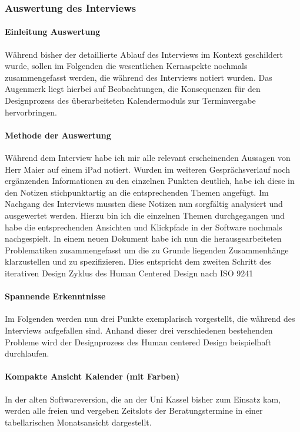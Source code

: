 \documentclass[12pt]{article}
\newcommand{\ipName}{Herr Maier }
\begin{document}
\subsubsection{Auswertung des Interviews}

\paragraph{Einleitung Auswertung}
Während bisher der detaillierte Ablauf des Interviews im Kontext geschildert
wurde, sollen im Folgenden die wesentlichen Kernaspekte nochmals
zusammengefasst werden, die während des Interviews notiert wurden. Das
Augenmerk liegt hierbei auf Beobachtungen, die Konsequenzen für den
Designprozess des überarbeiteten Kalendermoduls zur Terminvergabe
hervorbringen.

\paragraph{Methode der Auswertung}
Während dem Interview habe ich mir alle relevant erscheinenden Aussagen von
\ipName auf einem iPad notiert. Wurden im weiteren Gesprächsverlauf noch
ergänzenden Informationen zu den einzelnen Punkten deutlich, habe ich diese in
den Notizen stichpunktartig an die entsprechenden Themen angefügt. Im Nachgang
des Interviews mussten diese Notizen nun sorgfältig analysiert und ausgewertet
werden. Hierzu bin ich die einzelnen Themen durchgegangen und habe die
entsprechenden Ansichten und Klickpfade in der Software nochmals nachgespielt.
In einem neuen Dokument habe ich nun die herausgearbeiteten Problematiken
zusammengefasst um die zu Grunde liegenden Zusammenhänge klarzustellen und zu
spezifizieren. Dies entspricht dem zweiten Schritt des iterativen Design Zyklus
des Human Centered Design nach ISO 9241 \cite{iso9241}

\paragraph{Spannende Erkenntnisse}
Im Folgenden werden nun drei Punkte exemplarisch vorgestellt, die während des
Interviews aufgefallen sind. Anhand dieser drei verschiedenen bestehenden
Probleme wird der Designprozess des Human centered Design beispielhaft
durchlaufen.

\paragraph{Kompakte Ansicht Kalender (mit Farben)}
In der alten Softwareversion, die an der Uni Kassel bisher zum Einsatz kam,
werden alle freien und vergeben Zeitslots der Beratungstermine in einer
tabellarischen Monatsansicht dargestellt.
\end{document}
